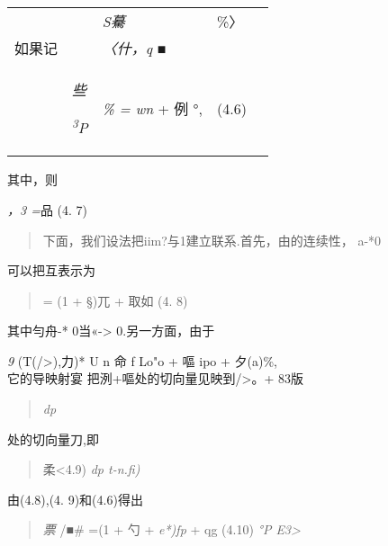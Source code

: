 \documentclass{article}
\begin{document}
\begin{longtable}[]{@{}lllll@{}}
\toprule
\endhead
& & \emph{S驀} & \%〉 &\tabularnewline
如果记 & & \emph{〈什，q ■} & &\tabularnewline
\begin{minipage}[t]{0.17\columnwidth}\raggedright
\strut
\end{minipage} & \begin{minipage}[t]{0.17\columnwidth}\raggedright
\emph{些}

\emph{\textsuperscript{3}P}\strut
\end{minipage} & \begin{minipage}[t]{0.17\columnwidth}\raggedright
\emph{\% = wn} + 例 °,\strut
\end{minipage} & \begin{minipage}[t]{0.17\columnwidth}\raggedright
(4.6)\strut
\end{minipage} & \begin{minipage}[t]{0.17\columnwidth}\raggedright
\strut
\end{minipage}\tabularnewline
\bottomrule
\end{longtable}

其中，则

\emph{，3 =}品 (4. 7)

\begin{quote}
下面，我们设法把iim?与1建立联系.首先，由的连续性， a-*0
\end{quote}

可以把互表示为

\begin{quote}
= (1 + §)兀 + 取如 (4. 8)
\end{quote}

其中勻舟-* 0当«-\textgreater{} 0.另一方面，由于

\emph{9} (T(/\textgreater{}),力)* U n 命 f Lo"o + 嘔 ipo + 夕(a)\%,\\
它的导映射宴 把洌+嘔处的切向量见映到/\textgreater{}。+ 83版

\begin{quote}
\emph{dp}
\end{quote}

处的切向量刀,即

\begin{quote}
柔\textless{}4.9) \emph{dp t-n.fi)}
\end{quote}

由(4.8),(4. 9)和(4.6)得出

\begin{quote}
\emph{票} /■\# =(1 + 勺 + \emph{e*)fp} + qg (4.10) \emph{°P
E3\textgreater{}}
\end{quote}
\end{document}
